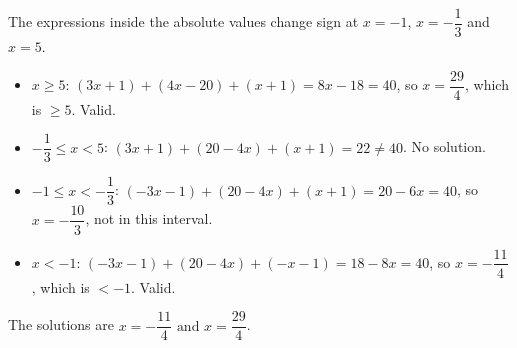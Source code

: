 The expressions inside the absolute values change sign at $x=-1$, $x=-\dfrac{1}{3}$ and $x=5$.
\begin{itemize}
\item $x\ge5$: $(3x+1)+(4x-20)+(x+1)=8x-18=40$, so $x=\dfrac{29}{4}$, which is $\ge5$. Valid.
\item $-\dfrac{1}{3}\le x<5$: $(3x+1)+(20-4x)+(x+1)=22\ne40$. No solution.
\item $-1\le x<-\dfrac{1}{3}$: $(-3x-1)+(20-4x)+(x+1)=20-6x=40$, so $x=-\dfrac{10}{3}$, not in this interval.
\item $x<-1$: $(-3x-1)+(20-4x)+(-x-1)=18-8x=40$, so $x=-\dfrac{11}{4}$, which is $<-1$. Valid.
\end{itemize}
The solutions are $\boxed{x=-\dfrac{11}{4}\text{ and }x=\dfrac{29}{4}}$.
